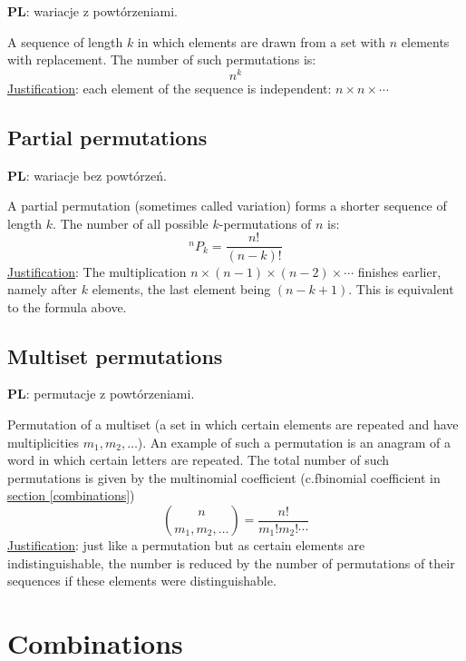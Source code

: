 \documentclass{article}
\makeatletter
\newcommand*{\cf}{c.f\@ifnextchar{.}{}{.\@\xspace}}
\makeatother
\begin{document}
\textbf{PL}: wariacje z powtórzeniami.

A sequence of length $k$ in which elements are drawn from a set with $n$ elements with replacement.
The number of such permutations is:
\begin{equation}
    n^k
\end{equation}
\underline{Justification}: each element of the sequence is independent: $n\times n\times \dotsb$

\subsection{Partial permutations}

\textbf{PL}: wariacje bez powtórzeń.

A partial permutation (sometimes called variation) forms a shorter sequence of length $k$. 
The number of all possible $k$\nobreakdash-\hspace{0pt}permutations of $n$ is:
\begin{equation}
    ^nP_k = \frac{n!}{(n-k)!}
\end{equation}
\underline{Justification}: The multiplication ${n\times(n-1)\times(n-2)\times \dotsb}$  finishes earlier, namely after $k$ elements, the last element being $(n-k+1)$.
This is equivalent to the formula above.

\subsection{Multiset permutations}
\label{mulper}

\textbf{PL}: permutacje z powtórzeniami.

Permutation of a multiset (a set in which certain elements are repeated and have multiplicities $m_1, m_2, \dotsc$).
An example of such a permutation is an anagram of a word in which certain letters are repeated.
The total number of such permutations is given by the multinomial coefficient (\cf binomial coefficient in \hyperref[combinations]{section \ref*{combinations}})
\begin{equation}
    \binom{n}{m_1, m_2, \dotsc} = \frac{n!}{m_1!m_2!\dotsm}
\end{equation}
\underline{Justification}: just like a permutation but as certain elements are indistinguishable, the number is reduced by the number of permutations of their sequences if these elements were distinguishable.

\section{Combinations}
\end{document}

